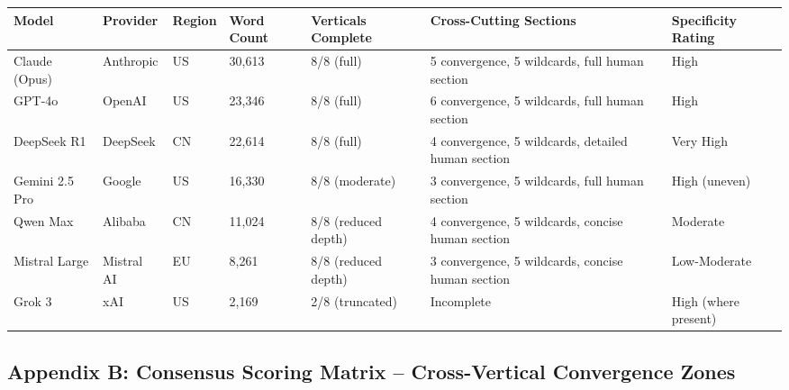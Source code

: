 \documentclass{article}
\begin{document}
\begin{table}[htbp]
\centering
\begin{tabular}{lllllll}
\toprule
\textbf{Model} & \textbf{Provider} & \textbf{Region} & \textbf{Word Count} & \textbf{Verticals Complete} & \textbf{Cross-Cutting Sections} & \textbf{Specificity Rating} \\
\midrule
Claude (Opus) & Anthropic & US & 30,613 & 8/8 (full) & 5 convergence, 5 wildcards, full human section & High \\
GPT-4o & OpenAI & US & 23,346 & 8/8 (full) & 6 convergence, 5 wildcards, full human section & High \\
DeepSeek R1 & DeepSeek & CN & 22,614 & 8/8 (full) & 4 convergence, 5 wildcards, detailed human section & Very High \\
Gemini 2.5 Pro & Google & US & 16,330 & 8/8 (moderate) & 3 convergence, 5 wildcards, full human section & High (uneven) \\
Qwen Max & Alibaba & CN & 11,024 & 8/8 (reduced depth) & 4 convergence, 5 wildcards, concise human section & Moderate \\
Mistral Large & Mistral AI & EU & 8,261 & 8/8 (reduced depth) & 3 convergence, 5 wildcards, concise human section & Low-Moderate \\
Grok 3 & xAI & US & 2,169 & 2/8 (truncated) & Incomplete & High (where present) \\
\bottomrule
\end{tabular}
\end{table}


\subsection{Appendix B: Consensus Scoring Matrix -- Cross-Vertical Convergence Zones}
\label{sec:appendix_b_consensus_scoring_matrix_cross_vertical_convergence_zones}
\end{document}
